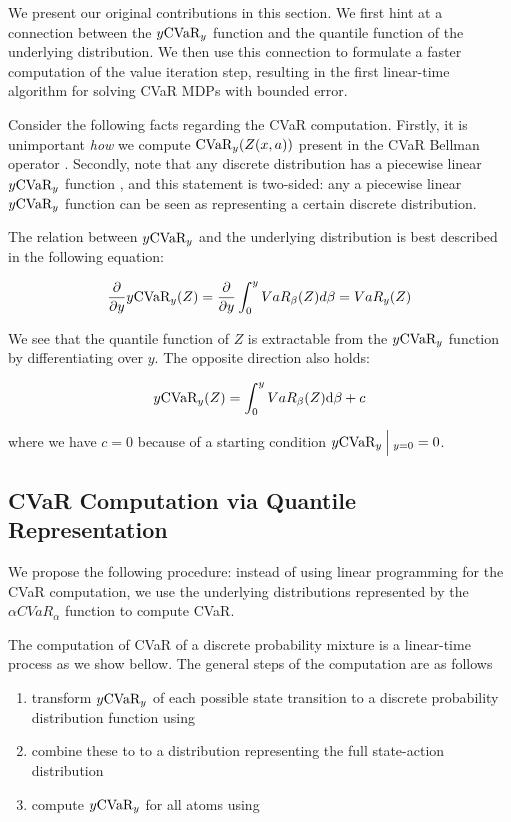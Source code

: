 We present our original contributions in this section. We first hint at a connection between the $y\cvar_y$ function and the quantile function of the underlying distribution. We then use this connection to formulate a faster computation of the value iteration step, resulting in the first linear-time algorithm for solving CVaR MDPs with bounded error.

Consider the following facts regarding the CVaR computation. Firstly, it is unimportant \emph{how} we compute $\cvar_y(Z(x, a))$ present in the CVaR Bellman operator . Secondly, note that any discrete distribution has a piecewise linear $y\cvar_y$ function \cite{rockafellar2002conditional}, and this statement is two-sided: any a piecewise linear $y\cvar_y$ function can be seen as representing a certain discrete distribution.

The relation between $y\cvar_y$ and the underlying distribution is best described in the following equation:

\begin{equation}\label{eqn:varcvarderivation}
\dfrac{\partial}{\partial y} y \cvar_y(Z) = \dfrac{\partial}{\partial y} \int_0^y VaR_\beta(Z) d\beta = VaR_y(Z)
\end{equation}

We see that the quantile function of $Z$ is extractable from the $y\cvar_y$ function by differentiating over $y$. The opposite direction also holds:

\begin{equation}\label{eqn:varcvarintegration}
y\cvar_y(Z) = \int_0^y VaR_\beta(Z) \dt \beta + c
\end{equation}

where we have $c=0$ because of a starting condition $y \cvar_y \given[\Big]_{y=0}=0$.

\subsection{CVaR Computation via Quantile Representation}

We propose the following procedure: instead of using linear programming for the CVaR computation, we use the underlying distributions represented by the $\alpha CVaR_\alpha$ function to compute CVaR.

The computation of CVaR of a discrete probability mixture is a linear-time process as we show bellow. The general steps of the computation are as follows

\begin{enumerate}
\item transform $y \cvar_y$ of each possible state transition to a discrete probability distribution function using 
\item combine these to to a distribution representing the full state-action distribution
\item compute $y \cvar_y$ for all atoms using 
\end{enumerate}

